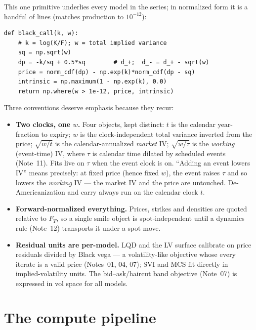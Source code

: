 \documentclass[11pt]{article}
\begin{document}
This one primitive underlies every model in the series; in normalized form it is a
handful of lines (matches production to $10^{-12}$):

\begin{lstlisting}[caption={The normalized Black call $\Black(k,w)$ --- the shared
pricing primitive (distilled from \texttt{core/black.py}).},label={lst:black}]
def black_call(k, w):
    # k = log(K/F); w = total implied variance
    sq = np.sqrt(w)
    dp = -k/sq + 0.5*sq        # d_+;  d_- = d_+ - sqrt(w)
    price = norm_cdf(dp) - np.exp(k)*norm_cdf(dp - sq)
    intrinsic = np.maximum(1 - np.exp(k), 0.0)
    return np.where(w > 1e-12, price, intrinsic)
\end{lstlisting}

Three conventions deserve emphasis because they recur:
\begin{itemize}[leftmargin=1.4em]
\item \textbf{Two clocks, one $w$.} Four objects, kept distinct: $t$ is the
calendar year-fraction to expiry; $w$ is the clock-independent total variance
inverted from the price; $\sqrt{w/t}$ is the calendar-annualized \emph{market}
IV; $\sqrt{w/\tau}$ is the \emph{working} (event-time) IV, where $\tau$ is
calendar time dilated by scheduled events (Note~11). Fits live on $\tau$ when
the event clock is on. ``Adding an event lowers IV'' means precisely: at fixed
price (hence fixed $w$), the event raises $\tau$ and so lowers the
\emph{working} IV --- the market IV and the price are untouched.
De-Americanization and carry always run on the calendar clock $t$.
\item \textbf{Forward-normalized everything.} Prices, strikes and densities are
quoted relative to $F_T$, so a single smile object is spot-independent until a
dynamics rule (Note~12) transports it under a spot move.
\item \textbf{Residual units are per-model.} LQD and the LV surface calibrate
on price residuals divided by Black vega --- a volatility-like objective whose
every iterate is a valid price (Notes~01, 04, 07); SVI and MCS fit directly in
implied-volatility units. The bid--ask/haircut band objective (Note~07) is
expressed in vol space for all models.
\end{itemize}

\section{The compute pipeline}
\label{sec:pipeline}
\end{document}
